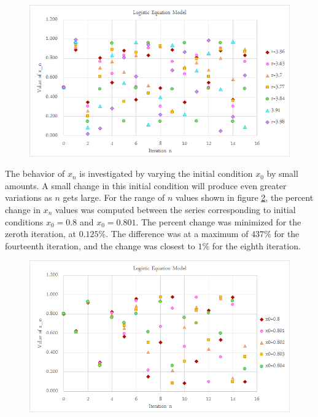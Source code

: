 \documentclass[a4paper]{article}
\begin{document}
\begin{figure}[H]
\centering
\includegraphics[width=1\textwidth]{chaos1.png}
\label{chaos1}
\end{figure}

\newpage 
The behavior of $x_n$ is investigated by varying the initial condition $x_0$ by small amounts. A small change in this initial condition will produce even greater variations as $n$ gets large. For the range of $n$ values shown in figure \ref{varyx0}, the percent change in $x_n$ values was computed between the series corresponding to initial conditions $x_0=0.8$ and $x_0=0.801$. The percent change was minimized for the zeroth iteration, at $0.125\%$. The difference was at a maximum of $437\%$ for the fourteenth iteration, and the change was closest to $1\%$ for the eighth iteration.

\begin{figure}[H]
\centering
\includegraphics[width=1\textwidth]{varyx0.png}
\label{varyx0}
\end{figure}
\end{document}
